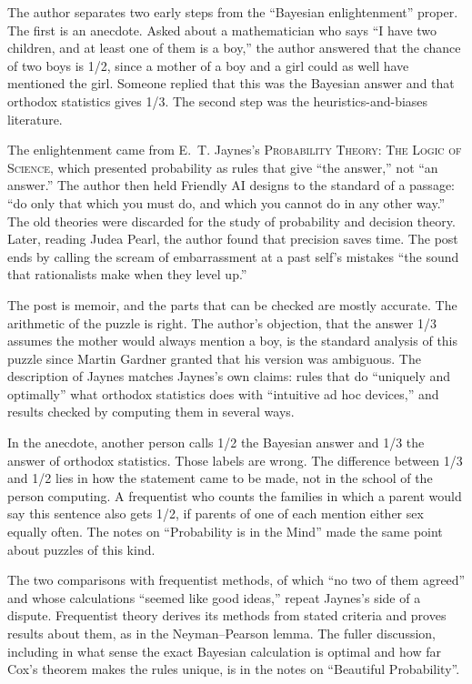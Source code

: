 \begin{afterword}
\summaryhead

The author separates two early steps from the ``Bayesian enlightenment'' proper. The first is an anecdote. Asked about a mathematician who says ``I have two children, and at least one of them is a boy,'' the author answered that the chance of two boys is 1/2, since a mother of a boy and a girl could as well have mentioned the girl. Someone replied that this was the Bayesian answer and that orthodox statistics gives 1/3. The second step was the heuristics-and-biases literature.

The enlightenment came from E.~T. Jaynes's \textsc{Probability Theory: The Logic of Science}, which presented probability as rules that give ``the answer,'' not ``an answer.'' The author then held Friendly AI designs to the standard of a passage: ``do only that which you must do, and which you cannot do in any other way.'' The old theories were discarded for the study of probability and decision theory. Later, reading Judea Pearl, the author found that precision saves time. The post ends by calling the scream of embarrassment at a past self's mistakes ``the sound that rationalists make when they level up.''

\responsehead

The post is memoir, and the parts that can be checked are mostly accurate. The arithmetic of the puzzle is right. The author's objection, that the answer 1/3 assumes the mother would always mention a boy, is the standard analysis of this puzzle since Martin Gardner granted that his version was ambiguous. The description of Jaynes matches Jaynes's own claims: rules that do ``uniquely and optimally'' what orthodox statistics does with ``intuitive ad hoc devices,'' and results checked by computing them in several ways.

In the anecdote, another person calls 1/2 the Bayesian answer and 1/3 the answer of orthodox statistics. Those labels are wrong. The difference between 1/3 and 1/2 lies in how the statement came to be made, not in the school of the person computing. A frequentist who counts the families in which a parent would say this sentence also gets 1/2, if parents of one of each mention either sex equally often. The notes on ``Probability is in the Mind'' made the same point about puzzles of this kind.

The two comparisons with frequentist methods, of which ``no two of them agreed'' and whose calculations ``seemed like good ideas,'' repeat Jaynes's side of a dispute. Frequentist theory derives its methods from stated criteria and proves results about them, as in the Neyman--Pearson lemma. The fuller discussion, including in what sense the exact Bayesian calculation is optimal and how far Cox's theorem makes the rules unique, is in the notes on ``Beautiful Probability''.


\end{afterword}
